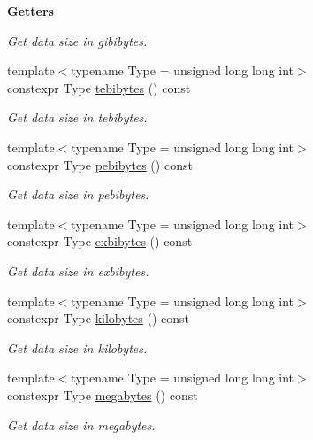 \begin{Indent}{\bf Getters}
\begin{DoxyCompactItemize}
\begin{DoxyCompactList}\small\item\em Get data size in gibibytes. \end{DoxyCompactList}\item 
{\footnotesize template$<$typename Type  = unsigned long long int$>$ }\\constexpr Type \hyperlink{exceptionmagrathea_1_1DataSize_a44e0aa087c6d74fa62b3e9fad3ab706d}{tebibytes} () const 
\begin{DoxyCompactList}\small\item\em Get data size in tebibytes. \end{DoxyCompactList}\item 
{\footnotesize template$<$typename Type  = unsigned long long int$>$ }\\constexpr Type \hyperlink{exceptionmagrathea_1_1DataSize_afa9b7a2c33c3673ad2cdecfce6c0c2c9}{pebibytes} () const 
\begin{DoxyCompactList}\small\item\em Get data size in pebibytes. \end{DoxyCompactList}\item 
{\footnotesize template$<$typename Type  = unsigned long long int$>$ }\\constexpr Type \hyperlink{exceptionmagrathea_1_1DataSize_af5cb17a3611bea11625f78ef498889e4}{exbibytes} () const 
\begin{DoxyCompactList}\small\item\em Get data size in exbibytes. \end{DoxyCompactList}\item 
{\footnotesize template$<$typename Type  = unsigned long long int$>$ }\\constexpr Type \hyperlink{exceptionmagrathea_1_1DataSize_ac70111a3953336284d030f5217f560c3}{kilobytes} () const 
\begin{DoxyCompactList}\small\item\em Get data size in kilobytes. \end{DoxyCompactList}\item 
{\footnotesize template$<$typename Type  = unsigned long long int$>$ }\\constexpr Type \hyperlink{exceptionmagrathea_1_1DataSize_a6cb109eed4fbf002e9df5ab03ed30b92}{megabytes} () const 
\begin{DoxyCompactList}\small\item\em Get data size in megabytes. \end{DoxyCompactList}\item 

\end{DoxyCompactItemize}
\end{Indent}

